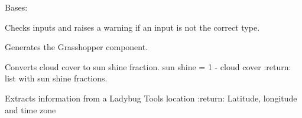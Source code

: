 \documentclass[letterpaper,10pt,english]{sphinxmanual}
\begin{document}
\begin{fulllineitems}
\label{\detokenize{cmf:livestock.components.comp_cmf.CMFWeather}}
Bases: {\hyperref[\detokenize{superclass:livestock.components.component.GHComponent}]{}}

\begin{fulllineitems}
\label{\detokenize{cmf:livestock.components.comp_cmf.CMFWeather.check_inputs}}
Checks inputs and raises a warning if an input is not the correct type.

\end{fulllineitems}


\begin{fulllineitems}
\label{\detokenize{cmf:livestock.components.comp_cmf.CMFWeather.config}}
Generates the Grasshopper component.

\end{fulllineitems}


\begin{fulllineitems}
\label{\detokenize{cmf:livestock.components.comp_cmf.CMFWeather.convert_cloud_cover}}
Converts cloud cover to sun shine fraction.
sun shine = 1 - cloud cover
:return: list with sun shine fractions.

\end{fulllineitems}


\begin{fulllineitems}
\label{\detokenize{cmf:livestock.components.comp_cmf.CMFWeather.convert_location}}
Extracts information from a Ladybug Tools location
:return: Latitude, longitude and time zone

\end{fulllineitems}


\end{fulllineitems}
\end{document}
